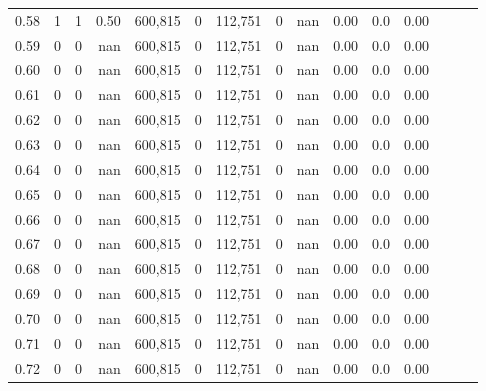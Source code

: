 \begin{tabular}{rrrrrrrrrrrrrrr}
0.58 &        1 &       1 &  0.50 &  600,815 &        0 &  112,751 &        0 &   nan &  0.00 &                     0.0 &      0.00 \\
0.59 &        0 &       0 &   nan &  600,815 &        0 &  112,751 &        0 &   nan &  0.00 &                     0.0 &      0.00 \\
0.60 &        0 &       0 &   nan &  600,815 &        0 &  112,751 &        0 &   nan &  0.00 &                     0.0 &      0.00 \\
0.61 &        0 &       0 &   nan &  600,815 &        0 &  112,751 &        0 &   nan &  0.00 &                     0.0 &      0.00 \\
0.62 &        0 &       0 &   nan &  600,815 &        0 &  112,751 &        0 &   nan &  0.00 &                     0.0 &      0.00 \\
0.63 &        0 &       0 &   nan &  600,815 &        0 &  112,751 &        0 &   nan &  0.00 &                     0.0 &      0.00 \\
0.64 &        0 &       0 &   nan &  600,815 &        0 &  112,751 &        0 &   nan &  0.00 &                     0.0 &      0.00 \\
0.65 &        0 &       0 &   nan &  600,815 &        0 &  112,751 &        0 &   nan &  0.00 &                     0.0 &      0.00 \\
0.66 &        0 &       0 &   nan &  600,815 &        0 &  112,751 &        0 &   nan &  0.00 &                     0.0 &      0.00 \\
0.67 &        0 &       0 &   nan &  600,815 &        0 &  112,751 &        0 &   nan &  0.00 &                     0.0 &      0.00 \\
0.68 &        0 &       0 &   nan &  600,815 &        0 &  112,751 &        0 &   nan &  0.00 &                     0.0 &      0.00 \\
0.69 &        0 &       0 &   nan &  600,815 &        0 &  112,751 &        0 &   nan &  0.00 &                     0.0 &      0.00 \\
0.70 &        0 &       0 &   nan &  600,815 &        0 &  112,751 &        0 &   nan &  0.00 &                     0.0 &      0.00 \\
0.71 &        0 &       0 &   nan &  600,815 &        0 &  112,751 &        0 &   nan &  0.00 &                     0.0 &      0.00 \\
0.72 &        0 &       0 &   nan &  600,815 &        0 &  112,751 &        0 &   nan &  0.00 &                     0.0 &      0.00 \\

\end{tabular}
